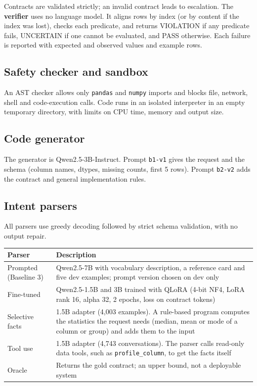 \documentclass[11pt]{article}
\begin{document}
Contracts are validated strictly; an invalid contract leads to
escalation. The \textbf{verifier} uses no language model. It aligns rows
by index (or by content if the index was lost), checks each predicate,
and returns VIOLATION if any predicate fails, UNCERTAIN if one cannot be
evaluated, and PASS otherwise. Each failure is reported with expected
and observed values and example rows.

\subsection{Safety checker and sandbox}

An AST checker allows only \texttt{pandas} and \texttt{numpy} imports
and blocks file, network, shell and code-execution calls. Code runs in
an isolated interpreter in an empty temporary directory, with limits on
CPU time, memory and output size.

\subsection{Code generator}

The generator is Qwen2.5-3B-Instruct. Prompt \texttt{b1-v1} gives the
request and the schema (column names, dtypes, missing counts, first 5
rows). Prompt \texttt{b2-v2} adds the contract and general
implementation rules.

\subsection{Intent parsers}

All parsers use greedy decoding followed by strict schema validation,
with no output repair.

\begin{table}[!tp]
\centering\footnotesize\setlength{\tabcolsep}{3pt}\renewcommand{\arraystretch}{1.1}
\begin{tabularx}{\textwidth}{l>{\raggedright\arraybackslash}X}
\toprule
\textbf{Parser} & \textbf{Description} \\
\midrule
Prompted (Baseline 3) & Qwen2.5-7B with vocabulary description, a reference card and five dev examples; prompt version chosen on dev only \\
Fine-tuned & Qwen2.5-1.5B and 3B trained with QLoRA (4-bit NF4, LoRA rank 16, alpha 32, 2 epochs, loss on contract tokens) \\
Selective facts & 1.5B adapter (4,003 examples). A rule-based program computes the statistics the request needs (median, mean or mode of a column or group) and adds them to the input \\
Tool use & 1.5B adapter (4,743 conversations). The parser calls read-only data tools, such as \texttt{profile\_\allowbreak{}column}, to get the facts itself \\
Oracle & Returns the gold contract; an upper bound, not a deployable system \\
\bottomrule
\end{tabularx}
\end{table}
\end{document}
